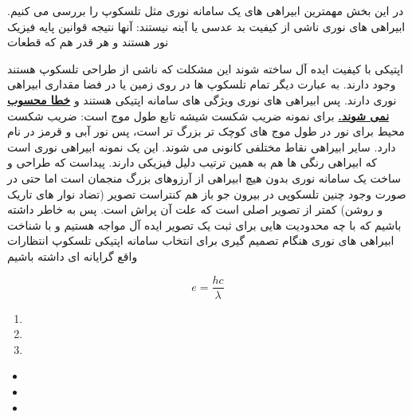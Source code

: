 \documentclass{report}
\begin{document}
در این بخش مهمترین ابیراهی های یک سامانه نوری مثل تلسکوپ را بررسی می کنیم. ابیراهی های نوری \cite{art1}
ناشی از کیفیت بد عدسی یا آینه نیستند: آنها نتیجه قوانین پایه فیزیک نور هستند و هر قدر هم که قطعات


اپتیکی با کیفیت ایده آل ساخته شوند این مشکلت که ناشی از طراحی تلسکوپ هستند وجود دارند. به عبارت
دیگر تمام تلسکوپ ها در روی زمین یا در فضا مقداری ابیراهی نوری دارند. پس ابیراهی های نوری ویژگی
های سامانه اپتیکی هستند و \textbf{\underline{خطا محسوب نمی شوند.}} برای نمونه ضریب شکست شیشه تابع طول موج
است: ضریب شکست محیط برای نور در طول موج های کوچک تر بزرگ تر است، پس نور آبی و قرمز در \cite{daryaee2014sasanian}
نام دارد. سایر ابیراهی نقاط مختلفی کانونی می شوند. این یک نمونه ابیراهی نوری است که ابیراهی رنگی 
ها هم به همین ترتیب دلیل فیزیکی دارند. پیداست که طراحی و ساخت یک سامانه نوری بدون هیچ ابیراهی از
آرزوهای بزرگ منجمان است اما حتی در صورت وجود چنین تلسکوپی در بیرون جو باز هم کنتراست تصویر
(تضاد نوار های تاریک و روشن) کمتر از تصویر اصلی است که علت آن پراش است. پس به خاطر داشته
باشیم که با چه محدودیت هایی برای ثبت یک تصویر ایده آل مواجه هستیم و با شناخت ابیراهی های نوری
هنگام تصمیم گیری برای انتخاب سامانه اپتیکی تلسکوپ انتظارات واقع گرایانه ای داشته باشیم

\begin{equation}
	e = \frac{hc}{\lambda}
\end{equation}

\begin{enumerate}
	\item {}
	\item {}
	\item {}
\end{enumerate}

\begin{itemize}
	\item {}
	\item {}
	\item {}
\end{itemize}

\begin{latin}


\end{latin}
\end{document}
